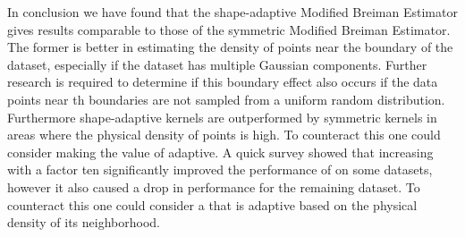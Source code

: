 

In conclusion we have found that the shape-adaptive Modified Breiman Estimator gives results comparable to those of the symmetric Modified Breiman Estimator. 
The former is better in estimating the density of points near the boundary of the dataset, especially if the dataset has multiple Gaussian components. Further research is required to determine if this boundary effect also occurs if the data points near th boundaries are not sampled from a uniform random distribution. 
Furthermore shape-adaptive kernels are outperformed by symmetric kernels in areas where the physical density of points is high. To counteract this one could consider making the value of \KNNK adaptive. A quick survey showed that increasing \KNNK with a factor ten significantly improved the performance of \sambe on some datasets, however it also caused a drop in performance for the remaining dataset. To counteract this one could consider a \KNNK that is adaptive based on the physical density of its neighborhood. 